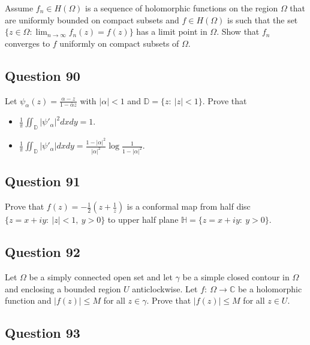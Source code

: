 \documentclass[12pt]{article}
\begin{document}
Assume \(f_n \in H(\Omega)\) is a sequence of holomorphic functions on
the region \(\Omega\) that are uniformly bounded on compact subsets and
\(f \in H(\Omega)\) is such that the set
\(\displaystyle \{z \in \Omega: \lim_{n \rightarrow \infty} f_n(z) = f(z) \}\)
has a limit point in \(\Omega\). Show that \(f_n\) converges to \(f\)
uniformly on compact subsets of \(\Omega\).

\hypertarget{question-90-1}{%
\subsection{Question 90}\label{question-90-1}}

Let \(\displaystyle{\psi_{\alpha}(z)=\frac{\alpha-z}{1-\bar{\alpha}z}}\)
with \(|\alpha|<1\) and \({\mathbb D}=\{z:\ |z|<1\}\). Prove that

\begin{itemize}
\item
  \(\displaystyle{\frac{1}{\pi}\iint_{{\mathbb D}} |\psi'_{\alpha}|^2 dx dy =1}\).
\item
  \(\displaystyle{\frac{1}{\pi}\iint_{{\mathbb D}} |\psi'_{\alpha}| dx dy =\frac{1-|\alpha|^2}{|\alpha|^2} \log \frac{1}{1-|\alpha|^2}}\).
\end{itemize}

\hypertarget{question-91-1}{%
\subsection{Question 91}\label{question-91-1}}

Prove that
\(\displaystyle{f(z)=-\frac{1}{2}\left(z+\frac{1}{z}\right)}\) is a
conformal map from half disc \(\{z=x+iy:\ |z|<1,\ y>0\}\) to upper half
plane \({\mathbb H}=\{z=x+iy:\ y>0\}\).

\hypertarget{question-92-1}{%
\subsection{Question 92}\label{question-92-1}}

Let \(\Omega\) be a simply connected open set and let \(\gamma\) be a
simple closed contour in \(\Omega\) and enclosing a bounded region \(U\)
anticlockwise. Let \(f: \ \Omega \to {\mathbb C}\) be a holomorphic
function and \(|f(z)|\leq M\) for all \(z\in \gamma\). Prove that
\(|f(z)|\leq M\) for all \(z\in U\).

\hypertarget{question-93-1}{%
\subsection{Question 93}\label{question-93-1}}
\end{document}
